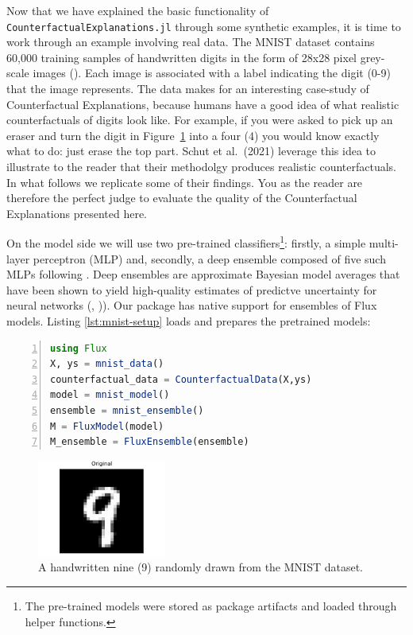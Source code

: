 \documentclass{juliacon}
\begin{document}
Now that we have explained the basic functionality of
\texttt{CounterfactualExplanations.jl} through some synthetic examples,
it is time to work through an example involving real data. The MNIST
dataset contains 60,000 training samples of handwritten digits in the
form of 28x28 pixel grey-scale images (\cite{lecun1998mnist}). Each
image is associated with a label indicating the digit (0-9) that the
image represents. The data makes for an interesting case-study of
Counterfactual Explanations, because humans have a good idea of what
realistic counterfactuals of digits look like. For example, if you were
asked to pick up an eraser and turn the digit in
Figure~\ref{fig-mnist-orig} into a four (4) you would know exactly what
to do: just erase the top part. Schut et al.~(2021)
\cite{schut2021generating} leverage this idea to illustrate to the
reader that their methodolgy produces realistic counterfactuals. In what
follows we replicate some of their findings. You as the reader are
therefore the perfect judge to evaluate the quality of the
Counterfactual Explanations presented here.

On the model side we will use two pre-trained classifiers\footnote{The
  pre-trained models were stored as package artifacts and loaded through
  helper functions.}: firstly, a simple multi-layer perceptron (MLP)
and, secondly, a deep ensemble composed of five such MLPs following
\cite{schut2021generating}. Deep ensembles are approximate Bayesian
model averages that have been shown to yield high-quality estimates of
predictve uncertainty for neural networks (\cite{wilson2020case},
\cite{lakshminarayanan2016simple})). Our package has native support for
ensembles of Flux models. Listing \ref{lst:mnist-setup} loads and
prepares the pretrained models:

\begin{lstlisting}[language=Julia, escapechar=@, numbers=left, label={lst:mnist-setup}, caption={}]
using Flux
X, ys = mnist_data() 
counterfactual_data = CounterfactualData(X,ys)
model = mnist_model()
ensemble = mnist_ensemble()
M = FluxModel(model)
M_ensemble = FluxEnsemble(ensemble)
\end{lstlisting}

\begin{figure}

{\centering \includegraphics[width=1.66667in,height=1.25in]{www/mnist_original.png}

}

\caption{\label{fig-mnist-orig}A handwritten nine (9) randomly drawn
from the MNIST dataset.}

\end{figure}
\end{document}
